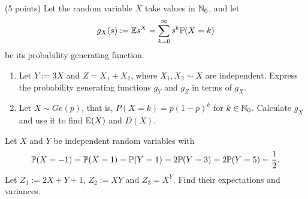 \documentclass[a4paper]{report}
\begin{document}
\begin{problem} (5 points)
Let the random variable $X$ take values in $\N_0$, and let
\[g_X(s):=\E s^X=\sum_{k=0}^{\infty}s^k\P(X=k)\]
be its probability generating function.
\begin{enumerate}
\item Let $Y:=3X$ and $Z=X_1+X_2$, where $X_1,X_2\sim X$ are independent. Express the probability generating functions $g_Y$ and $g_Z$ in terms of $g_X$.
\item Let $X\sim Ge(p)$, that is, $P(X=k)=p(1-p)^k$ for $k\in\N_0$. Calculate $g_X$ and use it to find $\E(X)$ and $D(X)$.
\end{enumerate}
\begin{problem}
Let $X$ and $Y$ be independent random variables with
\[\P(X=-1)=\P(X=1)=\P(Y=1)=2\P(Y=3)=2\P(Y=5)=\frac12.\]
Let $Z_1:=2X+Y+1$, $Z_2:=XY$ and $Z_3=X^Y$. Find their expectations and variances.
\end{problem}
\end{problem}
\end{document}
